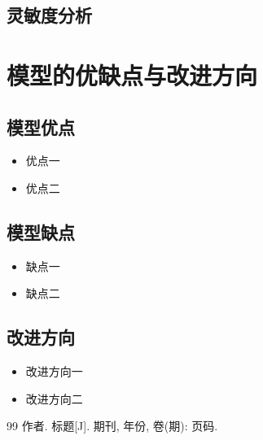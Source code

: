\documentclass[12pt,a4paper]{article}
\begin{document}
\subsection{灵敏度分析}
\label{sec:sensitivity}

\section{模型的优缺点与改进方向}
\label{sec:discussion}

\subsection{模型优点}
\begin{itemize}
    \item 优点一
    \item 优点二
\end{itemize}

\subsection{模型缺点}
\begin{itemize}
    \item 缺点一
    \item 缺点二
\end{itemize}

\subsection{改进方向}
\begin{itemize}
    \item 改进方向一
    \item 改进方向二
\end{itemize}

\begin{thebibliography}{99}
 作者. 标题[J]. 期刊, 年份, 卷(期): 页码.
\end{thebibliography}
\end{document}
